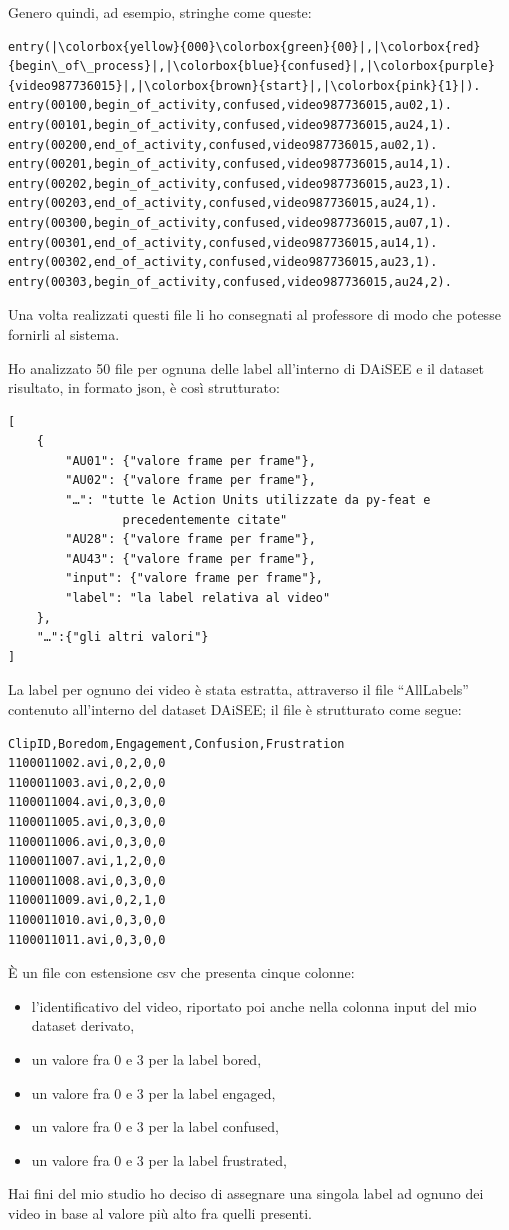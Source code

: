 Genero quindi, ad esempio, stringhe come queste:
\begin{verbatim}
entry(|\colorbox{yellow}{000}\colorbox{green}{00}|,|\colorbox{red}{begin\_of\_process}|,|\colorbox{blue}{confused}|,|\colorbox{purple}{video987736015}|,|\colorbox{brown}{start}|,|\colorbox{pink}{1}|).
entry(00100,begin_of_activity,confused,video987736015,au02,1).
entry(00101,begin_of_activity,confused,video987736015,au24,1).
entry(00200,end_of_activity,confused,video987736015,au02,1).
entry(00201,begin_of_activity,confused,video987736015,au14,1).
entry(00202,begin_of_activity,confused,video987736015,au23,1).
entry(00203,end_of_activity,confused,video987736015,au24,1).
entry(00300,begin_of_activity,confused,video987736015,au07,1).
entry(00301,end_of_activity,confused,video987736015,au14,1).
entry(00302,end_of_activity,confused,video987736015,au23,1).
entry(00303,begin_of_activity,confused,video987736015,au24,2).
\end{verbatim}

Una volta realizzati questi file li ho consegnati al professore di modo che potesse fornirli al sistema.

Ho analizzato 50 file per ognuna delle label all’interno di DAiSEE e il dataset risultato, in formato json, è così strutturato:
\begin{verbatim}
[
    {
        "AU01": {"valore frame per frame"},
        "AU02": {"valore frame per frame"},
        "…": "tutte le Action Units utilizzate da py-feat e 
                precedentemente citate"
        "AU28": {"valore frame per frame"},
        "AU43": {"valore frame per frame"},
        "input": {"valore frame per frame"},
        "label": "la label relativa al video"
    },
    "…":{"gli altri valori"}
]
\end{verbatim}

La label per ognuno dei video è stata estratta, attraverso il file “AllLabels” contenuto all’interno del dataset DAiSEE; il file è strutturato come segue:
\begin{verbatim}
ClipID,Boredom,Engagement,Confusion,Frustration 
1100011002.avi,0,2,0,0
1100011003.avi,0,2,0,0
1100011004.avi,0,3,0,0
1100011005.avi,0,3,0,0
1100011006.avi,0,3,0,0
1100011007.avi,1,2,0,0
1100011008.avi,0,3,0,0
1100011009.avi,0,2,1,0
1100011010.avi,0,3,0,0
1100011011.avi,0,3,0,0
\end{verbatim}
È un file con estensione csv che presenta cinque colonne:
\begin{itemize}
\item l’identificativo del video, riportato poi anche nella colonna input del mio dataset derivato,
\item un valore fra 0 e 3 per la label bored,
\item un valore fra 0 e 3 per la label engaged,
\item un valore fra 0 e 3 per la label confused,
\item un valore fra 0 e 3 per la label frustrated,
\end{itemize} 
Hai fini del mio studio ho deciso di assegnare una singola label ad ognuno dei video in base al valore più alto fra quelli presenti.

